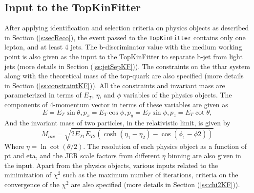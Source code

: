\subsection{Input to the TopKinFitter}
\label{ss:inputKF} 
After applying identification and selection criteria on physics objects as described
in Section (\ref{s:secReco}), the event passed to the \verb|TopKinFitter| contains only one lepton, 
\MET and at least 4 jets. The b-discriminator value with the medium working point is also 
given as the input to the TopKinFitter to separate b-jet from light jets (more details in 
Section (\ref{ss:jetSepKF})). The constraints on the ttbar system along with the 
theoretical mass of the top-quark are also specified (more details in Section 
(\ref{ss:constraintKF})). All the constraints and invariant mass are parameterized in 
terms of $E_{T}$, $\eta$, and $\phi$ variables of the physics objects. The components of 
4-momentum vector in terms of these variables are given as
\begin{equation}
E = E_{T} \sin\theta, p_x = E_{T}\cos\phi, p_y = E_{T}\sin\phi, p_z = E_{T}\cot\theta,
\end{equation}
And the invariant mass of two particles, in the relativistic limit, is given by
\begin{equation}
	M_{inv} = \sqrt{2 E_{T1}E_{T2}\left(\cosh(\eta_1 - \eta_2) - \cos(\phi_1 - \phi2)\right)}
\end{equation}
Where $\eta = \ln\cot(\theta/2)$. The resolution of each physics object as a function of 
pt and eta, and the JER scale factors from different $\eta$ binning are also given in the 
input. Apart from the physics objects, various inputs related to the minimization of 
$\chi^2$ such as the maximum number of iterations, criteria on the convergence of the $\chi^2$
are also specified (more details in Section (\ref{ss:chi2KF})).

